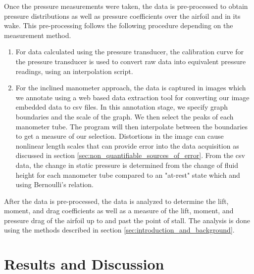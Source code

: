 \documentclass[runningheads]{llncs}
\begin{document}
\noindent
Once the pressure measurements were taken, the data is pre-processed to obtain pressure distributions as well as pressure coefficients over the airfoil and in its wake. This pre-processing follows the following procedure depending on the measurement method.\newline

\begin{enumerate}

    \item For data calculated using the pressure transducer, the calibration curve for the pressure transducer is used to convert raw data into equivalent pressure readings, using an interpolation script.

    \item For the inclined manometer approach, the data is captured in images which we annotate using a web based data extraction tool for converting our image embedded data to csv files.\cite{Rohatgi2020} In this annotation stage, we specify graph boundaries and the scale of the graph. We then select the peaks of each manometer tube. The program will then interpolate between the boundaries to get a measure of our selection. Distortions in the image can cause nonlinear length scales that can provide error into the data acquisition as discussed in section \ref{sec:non_quantifiable_sources_of_error}. From the csv data, the change in static pressure is determined from the change of fluid height for each manometer tube compared to an "at-rest" state which and using Bernoulli's relation.

\end{enumerate}

\noindent
After the data is pre-processed, the data is analyzed to determine the lift, moment, and drag coefficients as well as a measure of the lift, moment, and pressure drag of the airfoil up to and past the point of stall. The analysis is done using the methods described in section \ref{sec:introduction_and_background}.\newline




\section{Results and Discussion}
\end{document}
